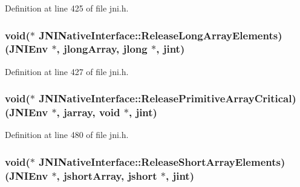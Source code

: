 Definition at line 425 of file jni.\-h.

\hypertarget{struct_j_n_i_native_interface_aae5a7ea0d31f5d6d1885e70fbfab28ef}{
\subsubsection[{Release\-Long\-Array\-Elements}]{\setlength{\rightskip}{0pt plus 5cm}void($\ast$ J\-N\-I\-Native\-Interface\-::\-Release\-Long\-Array\-Elements)({\bf J\-N\-I\-Env} $\ast$, {\bf jlong\-Array}, {\bf jlong} $\ast$, {\bf jint})}}\label{struct_j_n_i_native_interface_aae5a7ea0d31f5d6d1885e70fbfab28ef}


Definition at line 427 of file jni.\-h.

\hypertarget{struct_j_n_i_native_interface_ae879e30feb702b2f2c50726fe3211ecc}{
\subsubsection[{Release\-Primitive\-Array\-Critical}]{\setlength{\rightskip}{0pt plus 5cm}void($\ast$ J\-N\-I\-Native\-Interface\-::\-Release\-Primitive\-Array\-Critical)({\bf J\-N\-I\-Env} $\ast$, {\bf jarray}, void $\ast$, {\bf jint})}}\label{struct_j_n_i_native_interface_ae879e30feb702b2f2c50726fe3211ecc}


Definition at line 480 of file jni.\-h.

\hypertarget{struct_j_n_i_native_interface_a8c19f7a7fdb9777013fc794330905532}{
\subsubsection[{Release\-Short\-Array\-Elements}]{\setlength{\rightskip}{0pt plus 5cm}void($\ast$ J\-N\-I\-Native\-Interface\-::\-Release\-Short\-Array\-Elements)({\bf J\-N\-I\-Env} $\ast$, {\bf jshort\-Array}, {\bf jshort} $\ast$, {\bf jint})}}\label{struct_j_n_i_native_interface_a8c19f7a7fdb9777013fc794330905532}


